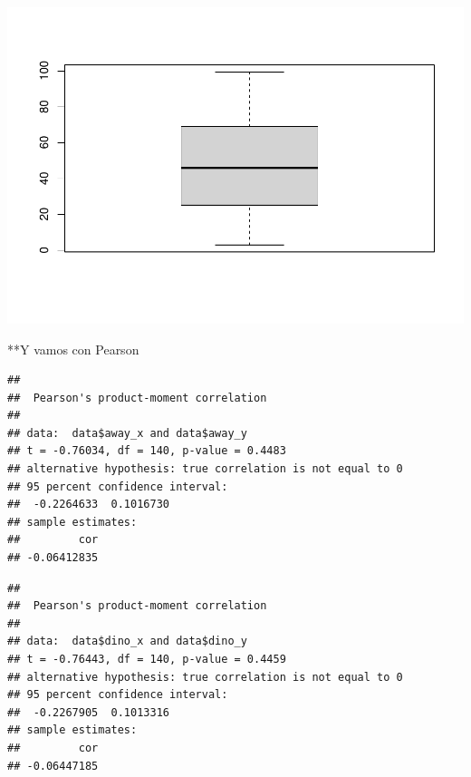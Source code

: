 \documentclass[
]{book}
\newenvironment{Shaded}{\begin{snugshade}}{\end{snugshade}}
\newcommand{\AttributeTok}[1]{\textcolor[rgb]{0.77,0.63,0.00}{#1}}
\newcommand{\FunctionTok}[1]{\textcolor[rgb]{0.00,0.00,0.00}{#1}}
\newcommand{\NormalTok}[1]{#1}
\newcommand{\SpecialCharTok}[1]{\textcolor[rgb]{0.00,0.00,0.00}{#1}}
\newcommand{\StringTok}[1]{\textcolor[rgb]{0.31,0.60,0.02}{#1}}
\begin{document}
\includegraphics{Esatadistica_en_R_files/figure-latex/unnamed-chunk-213-4.pdf}

**Y vamos con Pearson

\begin{Shaded}
\end{Shaded}

\begin{verbatim}
## 
##  Pearson's product-moment correlation
## 
## data:  data$away_x and data$away_y
## t = -0.76034, df = 140, p-value = 0.4483
## alternative hypothesis: true correlation is not equal to 0
## 95 percent confidence interval:
##  -0.2264633  0.1016730
## sample estimates:
##         cor 
## -0.06412835
\end{verbatim}

\begin{Shaded}
\end{Shaded}

\begin{verbatim}
## 
##  Pearson's product-moment correlation
## 
## data:  data$dino_x and data$dino_y
## t = -0.76443, df = 140, p-value = 0.4459
## alternative hypothesis: true correlation is not equal to 0
## 95 percent confidence interval:
##  -0.2267905  0.1013316
## sample estimates:
##         cor 
## -0.06447185
\end{verbatim}
\end{document}
